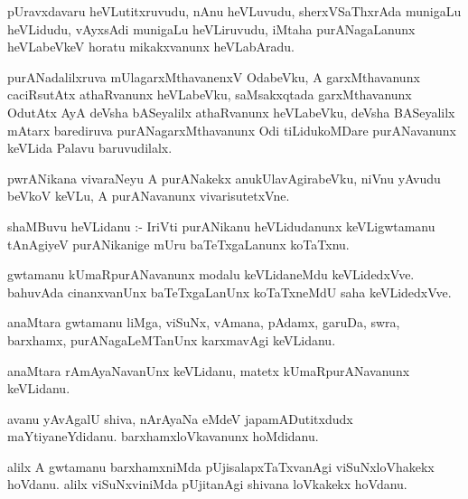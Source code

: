 \documentclass{article}
\begin{document}
\begin{mn}
pUravxdavaru  heVLutitxruvudu,  nAnu  heVLuvudu,  sherxVSaThxrAda  munigaLu  heVLidudu,  vAyxsAdi  
munigaLu  heVLiruvudu,  iMtaha  purANagaLanunx  heVLabeVkeV  horatu  mikakxvanunx  heVLabAradu.
\end{mn}

\begin{mn}
purANadalilxruva  mUlagarxMthavanenxV  OdabeVku,  A  garxMthavanunx  caciRsutAtx  athaRvanunx  heVLabeVku,  
saMsakxqtada  garxMthavanunx  OdutAtx  AyA  deVsha bASeyalilx  athaRvanunx  heVLabeVku,  deVsha BASeyalilx  
mAtarx  barediruva  purANagarxMthavanunx  Odi  tiLidukoMDare  purANavanunx  keVLida  Palavu  baruvudilalx.
\end{mn}

\begin{mn}
pwrANikana  vivaraNeyu  A  purANakekx  anukUlavAgirabeVku,  niVnu  yAvudu  beVkoV  keVLu,  A  purANavanunx  
vivarisutetxVne.
\end{mn}

\begin{mn}
shaMBuvu  heVLidanu :-  IriVti  purANikanu  heVLidudanunx  keVLigwtamanu  tAnAgiyeV  purANikanige  mUru  
baTeTxgaLanunx  koTaTxnu.
\end{mn}

\begin{mn}
gwtamanu  kUmaRpurANavanunx  modalu  keVLidaneMdu  keVLidedxVve.  bahuvAda  cinanxvanUnx  baTeTxgaLanUnx  
koTaTxneMdU  saha  keVLidedxVve.
\end{mn}

\begin{mn}
anaMtara  gwtamanu  liMga,  viSuNx,  vAmana,  pAdamx,  garuDa,  swra,  barxhamx,  purANagaLeMTanUnx  
karxmavAgi  keVLidanu.
\end{mn}

\begin{mn}
anaMtara  rAmAyaNavanUnx  keVLidanu,  matetx  kUmaRpurANavanunx  keVLidanu.
\end{mn}

\begin{mn}
avanu  yAvAgalU  shiva,  nArAyaNa  eMdeV  japamADutitxdudx  maYtiyaneYdidanu.  barxhamxloVkavanunx  hoMdidanu.
\end{mn}

\begin{mn}
alilx  A  gwtamanu  barxhamxniMda  pUjisalapxTaTxvanAgi  viSuNxloVhakekx  hoVdanu.  alilx  viSuNxviniMda  
pUjitanAgi  shivana  loVkakekx  hoVdanu.
\end{mn}
\end{document}
